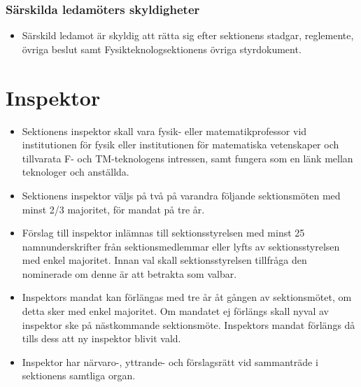 \documentclass[11pt,a4paper]{article}
\begin{document}
\subsubsection{Särskilda ledamöters skyldigheter}

\begin{itemize}


\item Särskild ledamot är skyldig att rätta sig efter sektionens stadgar,
   regle\-mente, övriga beslut samt Fysikteknologsektionens övriga styrdokument.


\end{itemize}

\newpage


\section{Inspektor}

\begin{itemize}

	\item Sektionens inspektor skall vara fysik- eller matematikprofessor vid institutionen för fysik eller institutionen för matematiska vetenskaper och tillvarata F- och TM-teknologens intressen, samt fungera som en länk mellan teknologer och anställda.
	
	\item Sektionens inspektor väljs på två på varandra följande sektionsmöten med minst 2/3 majoritet, för mandat på tre år. 
	
	\item Förslag till inspektor inlämnas till sektionsstyrelsen med minst 25 namnunderskrifter från sektionsmedlemmar eller lyfts av sektionsstyrelsen med enkel majoritet. Innan val skall sektionsstyrelsen tillfråga den nominerade om denne är att betrakta som valbar.
	
	\item Inspektors mandat kan förlängas med tre år åt gången av sektionsmötet, om detta sker med enkel majoritet. Om mandatet ej förlängs skall nyval av inspektor ske på nästkommande sektionsmöte. Inspektors mandat förlängs då tills dess att ny inspektor blivit vald.


\item Inspektor har närvaro-, yttrande- och förslagsrätt vid sammanträde i sektionens samtliga organ.

\end{itemize}
\end{document}
